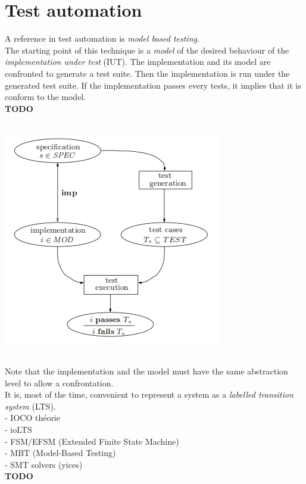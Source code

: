 \documentclass[a4paper]{report}
\begin{document}
\section*{Test automation}
A reference in test automation is \textit{model based testing}.\\
The starting point of this technique is a \textit{model} of the desired behaviour of the \textit{implementation under test} (IUT). The implementation and its model are confronted to generate a test suite. Then the implementation is run under the generated test suite. If the implementation passes every tests, it implies that it is conform to the model.\\
{\color{red} \textbf{TODO}}\\
\newline
$ $\\
\centerline{
  \includegraphics[scale=0.5]{img/modelBasedTesting.png}
}
$ $\\

Note that the implementation and the model must have the same abstraction level to allow a confrontation.\\
It is, most of the time, convenient to represent a system as a \textit{labelled transition system} (LTS).\\
\newline
- IOCO théorie\\
- ioLTS\\
- FSM/EFSM (Extended Finite State Machine)\\
- MBT (Model-Based Testing)\\
- SMT solvers (yices)\\
{\color{red} \textbf{TODO}}\\
\end{document}
